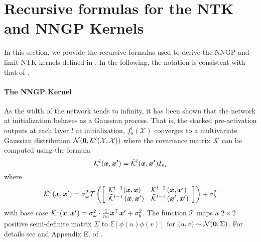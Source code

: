 \section{Recursive formulas for the NTK and NNGP Kernels}
\label{app:recursion}

In this section, we provide the recursive formulas used to derive the NNGP and limit NTK kernels defined in . In the following, the notation is consistent with that of .

\paragraph{The NNGP Kernel} As the width of the network tends to infinity, it has been shown that the network at initialization behaves as a Gaussian process. That is, the stacked pre-activation outputs at each layer $l$ at initialization, $f_0^l(\mathcal{X})$ converges to a multivariate Gaussian distribution $\mathcal{N}(\boldsymbol{0}, \mathcal{K}^l(\mathcal{X}, \mathcal{X}))$ where the covariance matrix $\mathcal{K}$ can be computed using the formula 
$$\mathcal{K}^l(\boldsymbol{x}, \boldsymbol{x'}) = \Tilde{\mathcal{K}}^l(\boldsymbol{x}, \boldsymbol{x'}) I_{n_l}$$
where 
\begin{equation}
\tilde{\mathcal{K}}^l\left(\boldsymbol{x}, \boldsymbol{x}^{\prime}\right)=\sigma_\omega^2 \mathcal{T}\left(\left[\begin{array}{ll}
\tilde{\mathcal{K}}^{l-1}(\boldsymbol{x}, \boldsymbol{x}) & \tilde{\mathcal{K}}^{l-1}\left(\boldsymbol{x}, \boldsymbol{x}^{\prime}\right) \\
\tilde{\mathcal{K}}^{l-1}\left(\boldsymbol{x}, \boldsymbol{x}^{\prime}\right) & \tilde{\mathcal{K}}^{l-1}\left(\boldsymbol{x}^{\prime}, \boldsymbol{x}^{\prime}\right)
\end{array}\right]\right)+\sigma_b^2
\label{eq:recur_K}
\end{equation}
with base case $\tilde{\mathcal{K}}^1(\boldsymbol{x}, \boldsymbol{x'}) = \sigma_\omega^2 \cdot \frac{1}{n_0} \boldsymbol{x}^\top \boldsymbol{x'} + \sigma_b^2$.
The function $\mathcal{T}$ maps a $2\times 2$ positive semi-definite matrix $\Sigma$ to $\mathbb{E}[\phi(u)\phi(v)]$ for $(u, v)\sim \mathcal{N}(\boldsymbol{0}, \Sigma)$.
For details see \cite{lee2018deep} and Appendix E. of \cite{NEURIPS2019_0d1a9651}.

